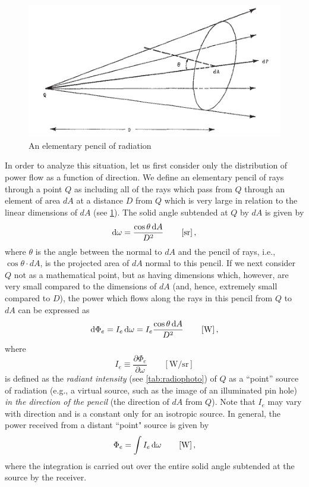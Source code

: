 \begin{figure}
\begin{center}
\includegraphics{figures/nicodemus1963-fig1.pdf}
\end{center}
\caption{An elementary pencil of radiation}
\label{fig:nicodemus1}
\end{figure}

In order to analyze this situation, let us first consider only the distribution
of power flow as a function of direction. We define an elementary pencil of rays
through a point $Q$ as including all of the rays which pass from $Q$ through an
element of area $dA$ at a distance $D$ from $Q$ which is very large in relation
to
the linear dimensions of $dA$ (see \cref{fig:nicodemus1}).
The solid angle subtended at $Q$ by $dA$ is given by
\begin{equation*}
\d\omega = \frac{\cos\theta \d A}{D^2}
\qquad \left[\si{\steradian}\right],
\end{equation*}
where $\theta$ is the angle between the normal to $dA$ and the pencil of rays,
i.e., $\cos\theta\cdot dA$, is the projected area of $dA$ normal to this pencil.
If we next consider $Q$ not as a mathematical point, but as having dimensions
which, however, are very small compared to the dimensions of $dA$ (and, hence,
extremely small compared to $D$), the power which flows along the rays in this
pencil from $Q$ to $dA$ can be expressed as
\begin{equation*}
\mathop{}\!\mathrm{d}\Phi_e = I_e \mathop{}\!\mathrm{d}\omega = I_e \frac{\cos\theta \mathop{}\!\mathrm{d} A}{D^2}
\qquad \left[\si{\watt}\right],
\end{equation*}
where
\begin{equation}
I_e \equiv \frac{\partial \Phi_e}{\partial \omega}
\qquad \left[\si{\watt\per\steradian}\right]
\end{equation}
is defined as the \textsl{radiant intensity} (see \cref{tab:radiophoto}) of
$Q$ as a “point” source of radiation (e.g., a virtual source, such as the image
of an illuminated pin hole) \emph{in the direction of the pencil} (the direction of
$dA$ from $Q$). Note that $I_e$ may vary with direction and is a constant only
for an isotropic source. In general, the power received from a distant “point"
source is given by
\begin{equation}
\Phi_e = \int I_e \mathop{}\!\mathrm{d}\omega
\qquad \left[\si{\watt}\right],
\end{equation}
where the integration is carried out over the entire solid angle subtended at
the source by the receiver.

